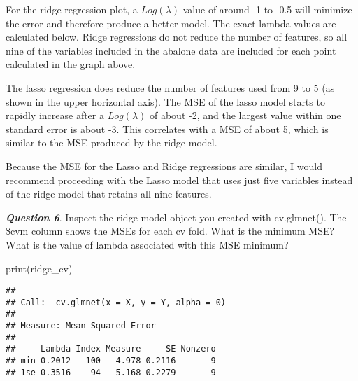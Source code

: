 \documentclass[
]{article}
\newenvironment{Shaded}{\begin{snugshade}}{\end{snugshade}}
\newcommand{\DecValTok}[1]{\textcolor[rgb]{0.00,0.00,0.81}{#1}}
\newcommand{\FunctionTok}[1]{\textcolor[rgb]{0.00,0.00,0.00}{#1}}
\newcommand{\NormalTok}[1]{#1}
\newcommand{\SpecialCharTok}[1]{\textcolor[rgb]{0.00,0.00,0.00}{#1}}
\newcommand{\StringTok}[1]{\textcolor[rgb]{0.31,0.60,0.02}{#1}}
\begin{document}
For the ridge regression plot, a \(Log(\lambda)\) value of around -1 to
-0.5 will minimize the error and therefore produce a better model. The
exact lambda values are calculated below. Ridge regressions do not
reduce the number of features, so all nine of the variables included in
the abalone data are included for each point calculated in the graph
above.

The lasso regression does reduce the number of features used from 9 to 5
(as shown in the upper horizontal axis). The MSE of the lasso model
starts to rapidly increase after a \(Log(\lambda)\) of about -2, and the
largest value within one standard error is about -3. This correlates
with a MSE of about 5, which is similar to the MSE produced by the ridge
model.

Because the MSE for the Lasso and Ridge regressions are similar, I would
recommend proceeding with the Lasso model that uses just five variables
instead of the ridge model that retains all nine features.

\textbf{\emph{Question 6}}. Inspect the ridge model object you created
with cv.glmnet(). The \$cvm column shows the MSEs for each cv fold. What
is the minimum MSE? What is the value of lambda associated with this MSE
minimum?

\begin{Shaded}
\begin{Highlighting}[]
\FunctionTok{print}\NormalTok{(ridge\_cv)}
\end{Highlighting}
\end{Shaded}

\begin{verbatim}
## 
## Call:  cv.glmnet(x = X, y = Y, alpha = 0) 
## 
## Measure: Mean-Squared Error 
## 
##     Lambda Index Measure     SE Nonzero
## min 0.2012   100   4.978 0.2116       9
## 1se 0.3516    94   5.168 0.2279       9
\end{verbatim}

\begin{Shaded}
\end{Shaded}
\end{document}
